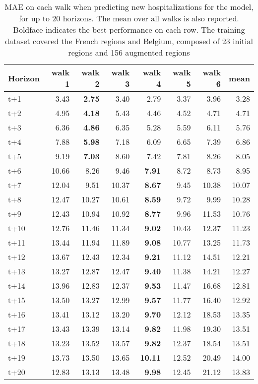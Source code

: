 \begin{table}[H]
\centering
\caption{MAE on each walk when predicting new hospitalizations for the model, for up to 20 horizons. The mean over all walks is also reported. Boldface indicates the best performance on each row. The training dataset covered the French regions and Belgium, composed of 23 initial regions and 156 augmented regions }
\label{tab:MAE_walk_dense_model}
\begin{tabular}{lrrrrrrr}
\toprule
Horizon &  walk 1 &  walk 2 &  walk 3 &  walk 4 &  walk 5 &  walk 6 &  mean \\
\midrule
t+1  & 3.43  & \textbf{2.75}  & 3.40  & 2.79  & 3.37  & 3.96  & 3.28  \\
t+2  & 4.95  & \textbf{4.18}  & 5.43  & 4.46  & 4.52  & 4.71  & 4.71  \\
t+3  & 6.36  & \textbf{4.86}  & 6.35  & 5.28  & 5.59  & 6.11  & 5.76  \\
t+4  & 7.88  & \textbf{5.98}  & 7.18  & 6.09  & 6.65  & 7.39  & 6.86  \\
t+5  & 9.19  & \textbf{7.03}  & 8.60  & 7.42  & 7.81  & 8.26  & 8.05  \\
t+6  & 10.66  & 8.26  & 9.46  & \textbf{7.91}  & 8.72  & 8.73  & 8.95  \\
t+7  & 12.04  & 9.51  & 10.37  & \textbf{8.67}  & 9.45  & 10.38  & 10.07  \\
t+8  & 12.47  & 10.27  & 10.61  & \textbf{8.59}  & 9.72  & 9.99  & 10.28  \\
t+9  & 12.43  & 10.94  & 10.92  & \textbf{8.77}  & 9.96  & 11.53  & 10.76  \\
t+10  & 12.76  & 11.46  & 11.34  & \textbf{9.02}  & 10.43  & 12.37  & 11.23  \\
t+11  & 13.44  & 11.94  & 11.89  & \textbf{9.08}  & 10.77  & 13.25  & 11.73  \\
t+12  & 13.67  & 12.43  & 12.34  & \textbf{9.21}  & 11.12  & 14.51  & 12.21  \\
t+13  & 13.27  & 12.87  & 12.47  & \textbf{9.40}  & 11.38  & 14.21  & 12.27  \\
t+14  & 13.96  & 12.83  & 12.37  & \textbf{9.53}  & 11.47  & 16.68  & 12.81  \\
t+15  & 13.50  & 13.27  & 12.99  & \textbf{9.57}  & 11.77  & 16.40  & 12.92  \\
t+16  & 13.41  & 13.12  & 13.20  & \textbf{9.70}  & 12.12  & 18.53  & 13.35  \\
t+17  & 13.43  & 13.39  & 13.14  & \textbf{9.82}  & 11.98  & 19.30  & 13.51  \\
t+18  & 13.23  & 13.52  & 13.57  & \textbf{9.82}  & 12.37  & 18.54  & 13.51  \\
t+19  & 13.73  & 13.50  & 13.65  & \textbf{10.11}  & 12.52  & 20.49  & 14.00  \\
t+20  & 12.83  & 13.13  & 13.48  & \textbf{9.98}  & 12.45  & 21.12  & 13.83  \\

\bottomrule
\end{tabular}
\end{table}
